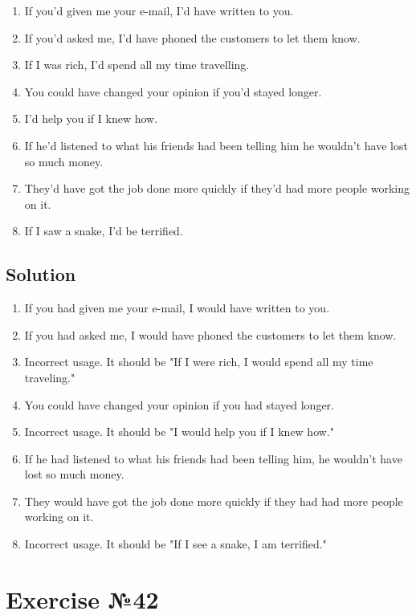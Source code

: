 \begin{enumerate}
      \item If you'd given me your e-mail, I'd have written to you.
      \item If you’d asked me, I’d have phoned the customers to let them know.
      \item If I was rich, I’d spend all my time travelling.
      \item You could have changed your opinion if you’d stayed longer.
      \item I’d help you if I knew how.
      \item If he’d listened to what his friends had been telling him he wouldn’t have lost so much money.
      \item They’d have got the job done more quickly if they’d had more people working on it.
      \item If I saw a snake, I’d be terrified.
\end{enumerate}

\subsection*{Solution}
\begin{enumerate}
      \item If you had given me your e-mail, I would have written to you.
      \item If you had asked me, I would have phoned the customers to let them know.
      \item Incorrect usage. It should be "If I were rich, I would spend all my time traveling."
      \item You could have changed your opinion if you had stayed longer.
      \item Incorrect usage. It should be "I would help you if I knew how."
      \item If he had listened to what his friends had been telling him, he wouldn’t have lost so much money.
      \item They would have got the job done more quickly if they had had more people working on it.
      \item Incorrect usage. It should be "If I see a snake, I am terrified."
\end{enumerate}

\section{Exercise №42}
